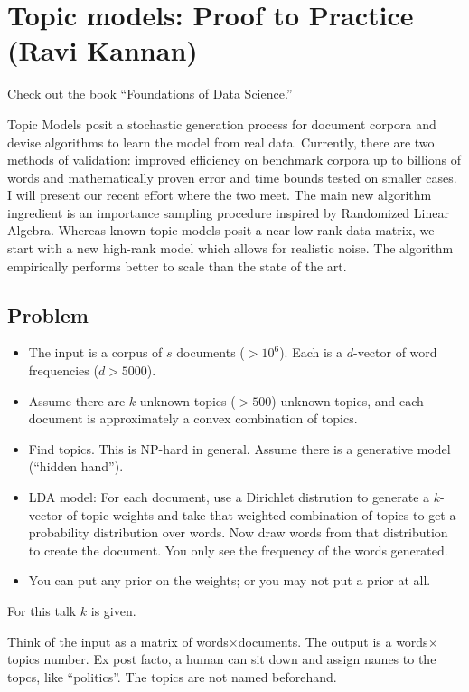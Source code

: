\section{Topic models: Proof to Practice (Ravi Kannan)}

Check out the book ``Foundations of Data Science.''

Topic Models posit a stochastic generation process for document corpora and devise algorithms to learn the model from real data. Currently, there are two methods of validation: improved efficiency on benchmark corpora up to billions of words and mathematically proven error and time bounds tested on smaller cases. I will present our recent effort where the two meet. The main new algorithm ingredient is an importance sampling procedure inspired by Randomized Linear Algebra. Whereas known topic models posit a near low-rank data matrix, we start with a new high-rank model which allows for realistic noise. The algorithm empirically performs better to scale  than the state of the art.

\subsection{Problem}
\begin{itemize}
\item
The input is a corpus of $s$ documents ($>10^6$). Each is a $d$-vector of word frequencies ($d>5000$). 
\item
Assume there are $k$ unknown topics ($>500$) unknown topics, and each document is approximately a convex combination of topics.
\item
Find topics. This is NP-hard in general. %
Assume there is a generative model (``hidden hand'').
\item
LDA model: For each document, use a Dirichlet distrution to generate a $k$-vector of topic weights and take that weighted combination of topics to get a probability distribution over words. Now draw words from that distribution to create the document. You only see the frequency of the words generated.
\item
You can put any prior on the weights; or you may not put a prior at all.
\end{itemize}
For this talk $k$ is given.

Think of the input as a matrix of words$\times$documents. The output is a words$\times$topics number.
Ex post facto, a human can sit down and assign names to the topcs, like ``politics''. The topics are not named beforehand.

